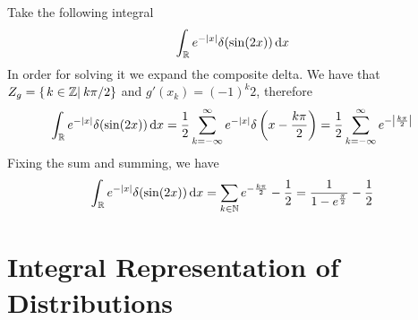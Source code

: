 \documentclass[../complete.tex]{subfiles}
\begin{document}
\begin{eg}
	Take the following integral
	\begin{equation*}
		\int_{\mathbb{R}}^{}e^{-\abs{x}}\delta(\sin(2x))\operatorname{d\!} x
	\end{equation*}
	In order for solving it we expand the composite delta. We have that $Z_g=\left\{\left.k\in\mathbb{Z}\right|_{} k\pi/2 \right\}$ and $g'(x_k)=(-1)^k2$, therefore
	\begin{equation*}
		\int_{\mathbb{R}}^{}e^{-\abs{x}}\delta(\sin(2x))\operatorname{d\!} x=\frac{1}{2}\sum_{k=-\infty}^\infty e^{-\abs{x}}\delta\left( x-\frac{k\pi}{2} \right)=\frac{1}{2}\sum_{k=-\infty}^{\infty}e^{-\abs{\frac{k\pi}{2}}}
	\end{equation*}
	Fixing the sum and summing, we have
	\begin{equation*}
		\int_{\mathbb{R}}^{}e^{-\abs{x}}\delta(\sin(2x))\operatorname{d\!} x=\sum_{k\in\mathbb{N}}^{}e^{-\frac{k\pi}{2}}-\frac{1}{2}=\frac{1}{1-e^{\frac{\pi}{2}}}-\frac{1}{2}
	\end{equation*}
\end{eg}
\section{Integral Representation of Distributions}
\end{document}
